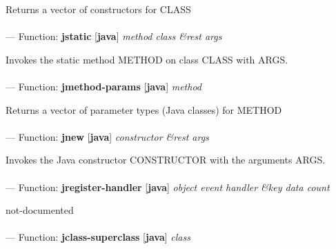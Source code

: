 \begin{adjustwidth}{5em}{5em}
Returns a vector of constructors for CLASS
\end{adjustwidth}

\paragraph{}
\label{JAVA:JSTATIC}
--- Function: \textbf{jstatic} [\textbf{java}] \textit{method class \&rest args}

\begin{adjustwidth}{5em}{5em}
Invokes the static method METHOD on class CLASS with ARGS.
\end{adjustwidth}

\paragraph{}
\label{JAVA:JMETHOD-PARAMS}
--- Function: \textbf{jmethod-params} [\textbf{java}] \textit{method}

\begin{adjustwidth}{5em}{5em}
Returns a vector of parameter types (Java classes) for METHOD
\end{adjustwidth}

\paragraph{}
\label{JAVA:JNEW}
--- Function: \textbf{jnew} [\textbf{java}] \textit{constructor \&rest args}

\begin{adjustwidth}{5em}{5em}
Invokes the Java constructor CONSTRUCTOR with the arguments ARGS.
\end{adjustwidth}

\paragraph{}
\label{JAVA:JREGISTER-HANDLER}
--- Function: \textbf{jregister-handler} [\textbf{java}] \textit{object event handler \&key data count}

\begin{adjustwidth}{5em}{5em}
not-documented
\end{adjustwidth}

\paragraph{}
\label{JAVA:JCLASS-SUPERCLASS}
--- Function: \textbf{jclass-superclass} [\textbf{java}] \textit{class}

